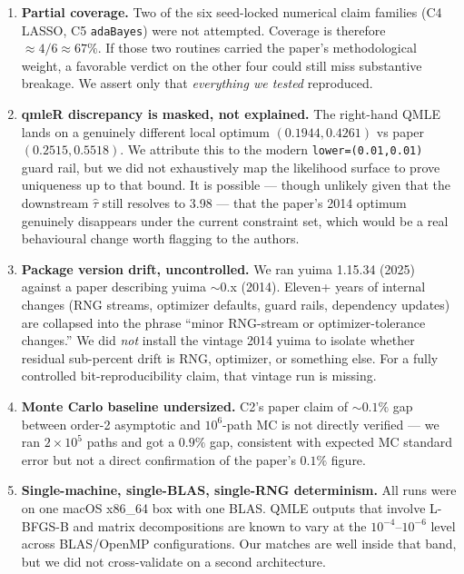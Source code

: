 \documentclass[11pt]{article}
\begin{document}
\begin{enumerate}
\item \textbf{Partial coverage.} Two of the six seed-locked numerical
      claim families (C4 LASSO, C5 \texttt{adaBayes}) were not attempted.
      Coverage is therefore $\approx 4/6 \approx 67\%$. If those two
      routines carried the paper's methodological weight, a favorable
      verdict on the other four could still miss substantive breakage.
      We assert only that \emph{everything we tested} reproduced.

\item \textbf{qmleR discrepancy is masked, not explained.} The right-hand
      QMLE lands on a genuinely different local optimum
      $(0.1944, 0.4261)$ vs paper $(0.2515, 0.5518)$. We attribute this
      to the modern \texttt{lower=(0.01,0.01)} guard rail, but we did not
      exhaustively map the likelihood surface to prove uniqueness up to
      that bound. It is possible --- though unlikely given that the
      downstream $\hat\tau$ still resolves to 3.98 --- that the paper's
      2014 optimum genuinely disappears under the current constraint set,
      which would be a real behavioural change worth flagging to the
      authors.

\item \textbf{Package version drift, uncontrolled.} We ran yuima 1.15.34
      (2025) against a paper describing yuima $\sim$0.x (2014).
      Eleven+ years of internal changes (RNG streams, optimizer defaults,
      guard rails, dependency updates) are collapsed into the phrase
      ``minor RNG-stream or optimizer-tolerance changes.'' We did
      \emph{not} install the vintage 2014 yuima to isolate whether
      residual sub-percent drift is RNG, optimizer, or something else.
      For a fully controlled bit-reproducibility claim, that vintage
      run is missing.

\item \textbf{Monte Carlo baseline undersized.} C2's paper claim of
      $\sim0.1\%$ gap between order-2 asymptotic and $10^6$-path MC is
      not directly verified --- we ran $2\!\times\!10^5$ paths and got a
      $0.9\%$ gap, consistent with expected MC standard error but not a
      direct confirmation of the paper's $0.1\%$ figure.

\item \textbf{Single-machine, single-BLAS, single-RNG determinism.} All
      runs were on one macOS x86\_64 box with one BLAS. QMLE outputs
      that involve L-BFGS-B and matrix decompositions are known to
      vary at the $10^{-4}$--$10^{-6}$ level across BLAS/OpenMP
      configurations. Our matches are well inside that band, but we
      did not cross-validate on a second architecture.


\end{enumerate}
\end{document}

